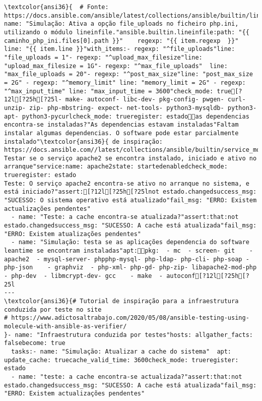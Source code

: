 \documentclass{scrartcl}
\begin{document}
\begin{Verbatim}
\textcolor{ansi36}{  # Fonte: https://docs.ansible.com/ansible/latest/collections/ansible/builtin/lineinfile_module.html}- name: "Simulação: Ativa a opção file_uploads no ficheiro php.ini, utilizando o módulo lineinfile."ansible.builtin.lineinfile:path: "{{ caminho_php_ini.files[0].path }}"    regexp: "{{ item.regexp  }}"  line: "{{ item.line }}"with_items:- regexp: "^file_uploads"line: "file_uploads = 1"- regexp: "^upload_max_filesize"line: "upload_max_filesize = 1G"- regexp: "^max_file_uploads"  line: "max_file_uploads = 20"- regexp: "^post_max_size"line: "post_max_size = 2G" - regexp: "^memory_limit" line: "memory_limit = 2G" - regexp: "^max_input_time" line: "max_input_time = 3600"check_mode: true[?12l[?25h[?25l- make- autoconf- libc-dev- pkg-config- pwgen- curl- unzip- zip- php-mbstring- expect- net-tools- python3-mysqldb- python3-apt- python3-pycurlcheck_mode: trueregister: estadoas dependencias encontra-se instaladas?"As dependencias estavam instaladas"Faltam instalar algumas dependencias. O software pode estar parcialmente instalado"\textcolor{ansi36}{ de inspiração: https://docs.ansible.com//latest/collections/ansible/builtin/service_module.html}Simulação: Testar se o serviço apache2 se encontra instalado, iniciado e ativo no arranque"service:name: apache2state: startedenabledcheck_mode: trueregister: estado
Teste: O serviço apache2 encontra-se ativo no arranque no sistema, e está iniciado?"assert:[?12l[?25h[?25lnot estado.changedsuccess_msg: "SUCESSO: O sistema operativo está atualizado"fail_msg: "ERRO: Existem actualizações pendentes"
  - name: "Teste: a cache encontra-se atualizada?"assert:that:not estado.changedsuccess_msg: "SUCESSO: A cache está atualizada"fail_msg: "ERRO: Existem atualizações pendentes"
  - name: "Simulação: testa se as aplicações dependencia do software leantime se encontram instaladas"apt:pkg:  - mc  - screen- git    - apache2  - mysql-server- phpphp-mysql- php-ldap- php-cli- php-soap - php-json    - graphviz  - php-xml- php-gd- php-zip- libapache2-mod-php  - php-dev  - libmcrypt-dev- gcc    - make  - autoconf[?12l[?25h[?25l
---
\textcolor{ansi36}{# Tutorial de inspiração para a infraestrutura conduzida por teste no site
# https://www.adictosaltrabajo.com/2020/05/08/ansible-testing-using-molecule-with-ansible-as-verifier/
}- name: "Infraestrutura conduzida por testes"hosts: allgather_facts: falsebecome: true
  tasks:- name: "Simulação: Atualizar a cache do sistema"  apt:  update_cache: truecache_valid_time: 3600check_mode: trueregister: estado
  - name: "teste: a cache encontra-se actualizada?"assert:that:not estado.changedsuccess_msg: "SUCESSO: A cache está atualizada"fail_msg: "ERRO: Existem actualizações pendentes"

\end{Verbatim}
\end{document}
